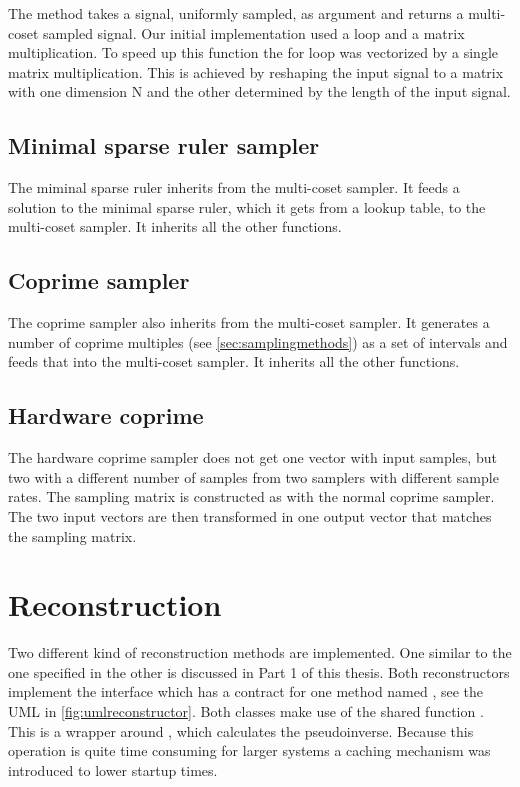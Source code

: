 \documentclass[a4paper, openany, oneside]{memoir}
\begin{document}
The method  takes a signal, uniformly sampled, as argument and returns a multi-coset sampled signal. Our initial implementation used a loop and a matrix multiplication. To speed up this function the for loop was vectorized by a single matrix multiplication. This is achieved by reshaping the input signal to a matrix with one dimension N and the other determined by the length of the input signal.

\subsection{Minimal sparse ruler sampler}
\label{sec:multi-coset-sampler}
The miminal sparse ruler inherits from the multi-coset sampler. It feeds a solution to the minimal sparse ruler, which it gets from a lookup table, to the multi-coset sampler. It inherits all the other functions.

\subsection{Coprime sampler}
\label{sec:coprime-sampler}
The coprime sampler also inherits from the multi-coset sampler. It generates a number of coprime multiples (see \cref{sec:samplingmethods}) as a set of intervals and feeds that into the multi-coset sampler. It inherits all the other functions.

\subsection{Hardware coprime}
\label{sec:hardware-coprime}
The hardware coprime sampler does not get one vector with input samples, but two with a different number of samples from two samplers with different sample rates. The sampling matrix is constructed as with the normal coprime sampler. The two input vectors are then transformed in one output vector that matches the sampling matrix.

\section{Reconstruction}
\label{sec:reconstruction}
Two different kind of reconstruction methods are implemented. One similar to the one specified in \cite{ariananda2012compressive} the other is discussed in Part 1 of this thesis. Both reconstructors implement the interface  which has a contract for one method named , see the UML in \cref{fig:umlreconstructor}. Both classes make use of the shared function . This is a wrapper around  , which calculates the pseudoinverse. Because this operation is quite time consuming for larger systems a caching mechanism was introduced to lower startup times.%
\end{document}
